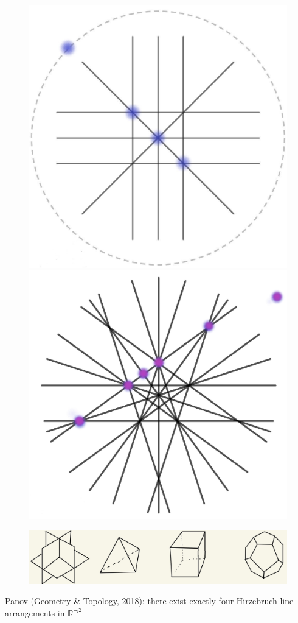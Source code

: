 \documentclass{beamer}
\begin{document}
\begin{frame}
\begin{figure}[!h]
		\includegraphics[scale=.1]{Hirzebruch3}
		\includegraphics[scale=.05]{Hirzebruch5}
	\end{figure}
	\pause
	\vspace{-1mm}
	\begin{figure}[!h]
		\includegraphics[scale=.15]{platon}
	\end{figure}
	\pause
	Panov (Geometry \& Topology, 2018): there exist exactly four Hirzebruch line arrangements in \(\mathbb{RP}^2\)
\end{frame}
\end{document}
